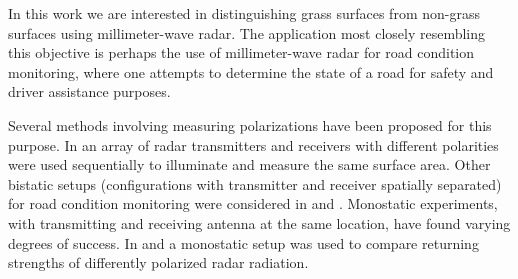 
In this work we are interested in distinguishing grass surfaces from non-grass surfaces using millimeter-wave radar. The application most closely resembling this objective is perhaps the use of millimeter-wave radar for road condition monitoring, where one attempts to determine the state of a road for safety and driver assistance purposes.

Several methods involving measuring polarizations have been proposed for this purpose. In \citep{finkele_schreck_wanielik_1995} an array of radar transmitters and receivers with different polarities were used sequentially to illuminate and measure the same surface area. Other bistatic setups (configurations with transmitter and receiver spatially separated) for road condition monitoring were considered in \citep{kees_detlefsen_1994} and \citep{finkele_1997}. Monostatic experiments, with transmitting and receiving antenna at the same location, have found varying degrees of success. In \citep{viikari_varpula_kantanen_2008} and \citep{hakli_saily_koivisto_huhtinen_dufva_rautiainen_toivanen_nummila_2013} a monostatic setup was used to compare returning strengths of differently polarized radar radiation. 



